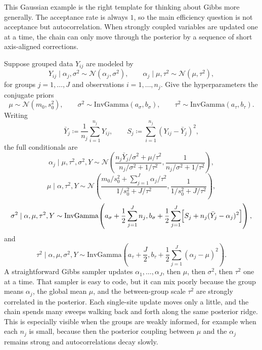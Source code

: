 This Gaussian example is the right template for thinking about Gibbs more generally.
The acceptance rate is always $1$, so the main efficiency question is not acceptance but autocorrelation.
When strongly coupled variables are updated one at a time, the chain can only move through the posterior by a sequence of short axis-aligned corrections.

\begin{example}
\label{ex:hierarchical-gibbs-blocking}
Suppose grouped data $Y_{ij}$ are modeled by
\[
  Y_{ij}\mid \alpha_j,\sigma^2 \sim \mathcal{N}(\alpha_j,\sigma^2),
  \qquad
  \alpha_j\mid \mu,\tau^2 \sim \mathcal{N}(\mu,\tau^2),
\]
for groups $j=1,\dots,J$ and observations $i=1,\dots,n_j$.
Give the hyperparameters the conjugate priors
\[
  \mu \sim \mathcal{N}(m_0,s_0^2),
  \qquad
  \sigma^2 \sim \mathrm{InvGamma}(a_\sigma,b_\sigma),
  \qquad
  \tau^2 \sim \mathrm{InvGamma}(a_\tau,b_\tau).
\]
Writing
\[
  \bar Y_j\coloneqq \frac{1}{n_j}\sum_{i=1}^{n_j}Y_{ij},
  \qquad
  S_j\coloneqq \sum_{i=1}^{n_j}(Y_{ij}-\bar Y_j)^2,
\]
the full conditionals are
\[
  \alpha_j \mid \mu,\tau^2,\sigma^2,Y
  \sim
  \mathcal{N}\!\left(
    \frac{n_j\bar Y_j/\sigma^2+\mu/\tau^2}{n_j/\sigma^2+1/\tau^2},
    \frac{1}{n_j/\sigma^2+1/\tau^2}
  \right),
\]
\[
  \mu \mid \alpha,\tau^2,Y
  \sim
  \mathcal{N}\!\left(
    \frac{m_0/s_0^2+\sum_{j=1}^J \alpha_j/\tau^2}{1/s_0^2+J/\tau^2},
    \frac{1}{1/s_0^2+J/\tau^2}
  \right),
\]
\[
  \sigma^2 \mid \alpha,\mu,\tau^2,Y
  \sim
  \mathrm{InvGamma}\!\left(
    a_\sigma+\frac12\sum_{j=1}^J n_j,
    b_\sigma+\frac12\sum_{j=1}^J\Bigl[S_j+n_j(\bar Y_j-\alpha_j)^2\Bigr]
  \right),
\]
and
\[
  \tau^2 \mid \alpha,\mu,\sigma^2,Y
  \sim
  \mathrm{InvGamma}\!\left(
    a_\tau+\frac{J}{2},
    b_\tau+\frac12\sum_{j=1}^J (\alpha_j-\mu)^2
  \right).
\]
A straightforward Gibbs sampler updates $\alpha_1,\dots,\alpha_J$, then $\mu$, then $\sigma^2$, then $\tau^2$ one at a time.
That sampler is easy to code, but it can mix poorly because the group means $\alpha_j$, the global mean $\mu$, and the between-group scale $\tau^2$ are strongly correlated in the posterior.
Each single-site update moves only a little, and the chain spends many sweeps walking back and forth along the same posterior ridge.
This is especially visible when the groups are weakly informed, for example when each $n_j$ is small, because then the posterior coupling between $\mu$ and the $\alpha_j$ remains strong and autocorrelations decay slowly.


\end{example}

